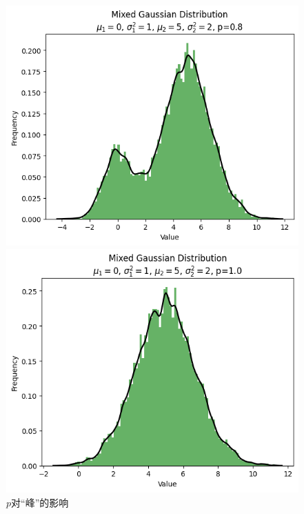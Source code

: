 \documentclass{article}
\begin{document}
\begin{figure}[H]
\begin{minipage}[b]{0.3\linewidth}
        \caption{$p=0.6$}
    \end{minipage}
    \hfill
    \begin{minipage}[b]{0.3\linewidth}
        \centering
        \includegraphics[width=\linewidth]{figure/p=0.8.png}
        \caption{$p=0.8$}
    \end{minipage}
    \hfill
    \begin{minipage}[b]{0.3\linewidth}
        \centering
        \includegraphics[width=\linewidth]{figure/p=1.0.png}
        \caption{$p=1.0$}
    \end{minipage}
    \caption{$p$对“峰”的影响}
    \label{fig:p}
\end{figure}
\end{document}
